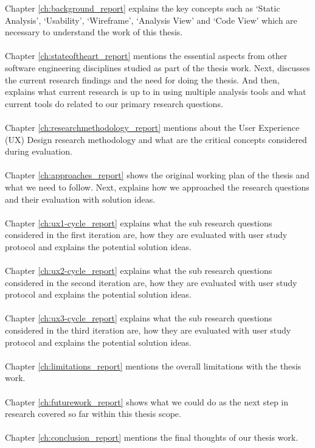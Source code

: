 \noindent Chapter \ref{ch:background_report} explains the key concepts such as ‘Static Analysis’, ‘Usability’, ‘Wireframe’, ‘Analysis View’ and ‘Code View’ which are necessary to understand the work of this thesis. \\ \\
Chapter \ref{ch:stateoftheart_report} mentions the essential aspects from other software engineering disciplines studied as part of the thesis work. Next, discusses the current research findings and the need for doing the thesis. And then, explains what current research is up to in using multiple analysis tools and what current tools do related to our primary research questions. \\ \\
Chapter \ref{ch:researchmethodology_report} mentions about the User Experience (UX) Design research methodology and what are the critical concepts considered during evaluation. \\ \\
Chapter \ref{ch:approaches_report} shows the original working plan of the thesis and what we need to follow. Next, explains how we approached the research questions and their evaluation with solution ideas. \\ \\
Chapter \ref{ch:ux1-cycle_report} explains what the sub research questions considered in the first iteration are, how they are evaluated with user study protocol and explains the potential solution ideas. \\ \\
Chapter \ref{ch:ux2-cycle_report} explains what the sub research questions considered in the second iteration are, how they are evaluated with user study protocol and explains the potential solution ideas. \\ \\
Chapter \ref{ch:ux3-cycle_report} explains what the sub research questions considered in the third iteration are, how they are evaluated with user study protocol and explains the potential solution ideas. \\ \\
Chapter \ref{ch:limitations_report} mentions the overall limitations with the thesis work. \\ \\
Chapter \ref{ch:futurework_report} shows what we could do as the next step in research covered so far within this thesis scope. \\ \\
Chapter \ref{ch:conclusion_report} mentions the final thoughts of our thesis work. \\ \\

\let\cleardoublepage\clearpage
